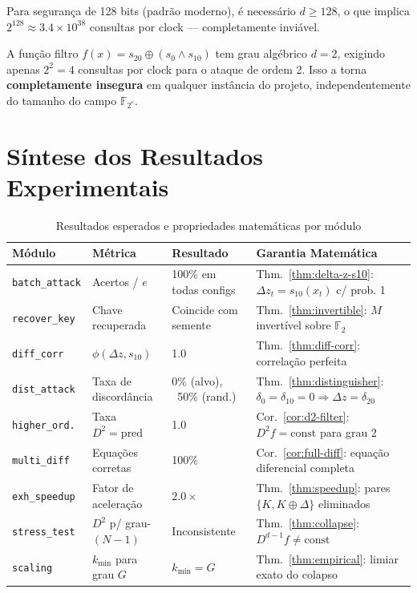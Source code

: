 \documentclass[12pt,a4paper]{article}
\theoremstyle{definition}
\theoremstyle{remark}
\newcommand{\GF}[1]{\mathbb{F}_{2^{#1}}}
\newcommand{\GFtwo}{\mathbb{F}_2}
\newcommand{\xor}{\oplus}
\newcommand{\AND}{\wedge}
\newcommand{\filter}{f}
\newcommand{\ks}{z}
\begin{document}
Para segurança de 128 bits (padrão moderno), é necessário $d \geq 128$,
o que implica $2^{128} \approx 3.4 \times 10^{38}$ consultas por clock ---
completamente inviável.

\begin{warnbox}
  A função filtro $\filter(x) = s_{20} \xor (s_0 \AND s_{10})$ tem grau
  algébrico $d = 2$, exigindo apenas $2^2 = 4$ consultas por clock para
  o ataque de ordem 2. Isso a torna \textbf{completamente insegura} em
  qualquer instância do projeto, independentemente do tamanho do campo
  $\GF{e}$.
\end{warnbox}

\section{Síntese dos Resultados Experimentais}
\label{sec:results}

\begin{table}[H]
  \centering
  \caption{Resultados esperados e propriedades matemáticas por módulo}
  \renewcommand{\arraystretch}{1.35}
  \begin{tabular}{lllp{5cm}}
    \toprule
    \textbf{Módulo} & \textbf{Métrica} & \textbf{Resultado} & \textbf{Garantia Matemática} \\
    \midrule
    \texttt{batch\_attack} &
      Acertos / $e$ &
      100\% em todas configs &
      Thm.~\ref{thm:delta-z-s10}: $\Delta\ks_t = s_{10}(x_t)$ c/ prob. 1 \\
    \texttt{recover\_key} &
      Chave recuperada &
      Coincide com semente &
      Thm.~\ref{thm:invertible}: $M$ invertível sobre $\GFtwo$ \\
    \texttt{diff\_corr} &
      $\phi(\Delta\ks, s_{10})$ &
      1.0 &
      Thm.~\ref{thm:diff-corr}: correlação perfeita \\
    \texttt{dist\_attack} &
      Taxa de discordância &
      0\% (alvo), ~50\% (rand.) &
      Thm.~\ref{thm:distinguisher}: $\delta_0=\delta_{10}=0 \Rightarrow \Delta\ks=\delta_{20}$ \\
    \texttt{higher\_ord.} &
      Taxa $D^2 = \text{pred}$ &
      1.0 &
      Cor.~\ref{cor:d2-filter}: $D^2 f = \text{const}$ para grau 2 \\
    \texttt{multi\_diff} &
      Equações corretas &
      100\% &
      Cor.~\ref{cor:full-diff}: equação diferencial completa \\
    \texttt{exh\_speedup} &
      Fator de aceleração &
      $2.0\times$ &
      Thm.~\ref{thm:speedup}: pares $\{K, K\xor\Delta\}$ eliminados \\
    \texttt{stress\_test} &
      $D^2$ p/ grau-$(N-1)$ &
      Inconsistente &
      Thm.~\ref{thm:collapse}: $D^{d-1} f \neq \text{const}$ \\
    \texttt{scaling} &
      $k_{\min}$ para grau $G$ &
      $k_{\min} = G$ &
      Thm.~\ref{thm:empirical}: limiar exato do colapso \\
    \bottomrule
  \end{tabular}
\end{table}
\end{document}
